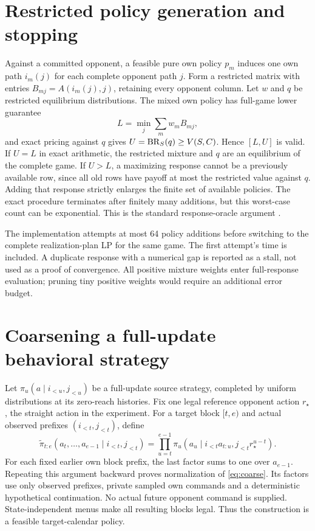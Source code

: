 \section{Restricted policy generation and stopping}
Against a committed opponent, a feasible pure own policy $p_m$ induces one
own path $i_m(j)$ for each complete opponent path $j$. Form a restricted
matrix with entries $B_{mj}=A(i_m(j),j)$, retaining every opponent column.
Let $w$ and $q$ be restricted equilibrium distributions. The mixed own policy
has full-game lower guarantee
\[
 L=\min_j\sum_m w_mB_{mj},
\]
and exact pricing against $q$ gives $U=\operatorname{BR}_S(q)\ge V(S,C)$. Hence $[L,U]$
is valid. If $U=L$ in exact arithmetic, the restricted mixture and $q$ are
an equilibrium of the complete game. If $U>L$, a maximizing response cannot
be a previously available row, since all old rows have payoff at most the
restricted value against $q$. Adding that response strictly enlarges the
finite set of available policies. The exact procedure terminates after
finitely many additions, but this worst-case count can be exponential.
This is the standard response-oracle argument
\citep{mcmahan2003,bosansky2014}.

The implementation attempts at most 64 policy additions before switching to
the complete realization-plan LP for the same game. The first attempt's
time is included. A duplicate response with a numerical gap is reported as
a stall, not used as a proof of convergence. All positive mixture weights
enter full-response evaluation; pruning tiny positive weights would require
an additional error budget.

\section{Coarsening a full-update behavioral strategy}
Let $\pi_u(a\mid i_{<u},j_{<u})$ be a full-update source strategy, completed
by uniform distributions at its zero-reach histories. Fix one legal reference
opponent action $r_\star$, the straight action in the experiment. For a target
block $[t,e)$ and actual observed prefixes $(i_{<t},j_{<t})$, define
\begin{equation}
 \widetilde\pi_{t:e}(a_t,\ldots,a_{e-1}\mid i_{<t},j_{<t})
 =\prod_{u=t}^{e-1}
 \pi_u\left(a_u\mid i_{<t}a_{t:u},j_{<t}r_\star^{u-t}\right).
 \label{eq:coarse}
\end{equation}
For each fixed earlier own block prefix, the last factor sums to one over
$a_{e-1}$. Repeating this argument backward proves normalization of
\eqref{eq:coarse}. Its factors use only observed prefixes, private sampled
own commands and a deterministic hypothetical continuation. No actual future
opponent command is supplied. State-independent menus make all resulting
blocks legal. Thus the construction is a feasible target-calendar policy.

